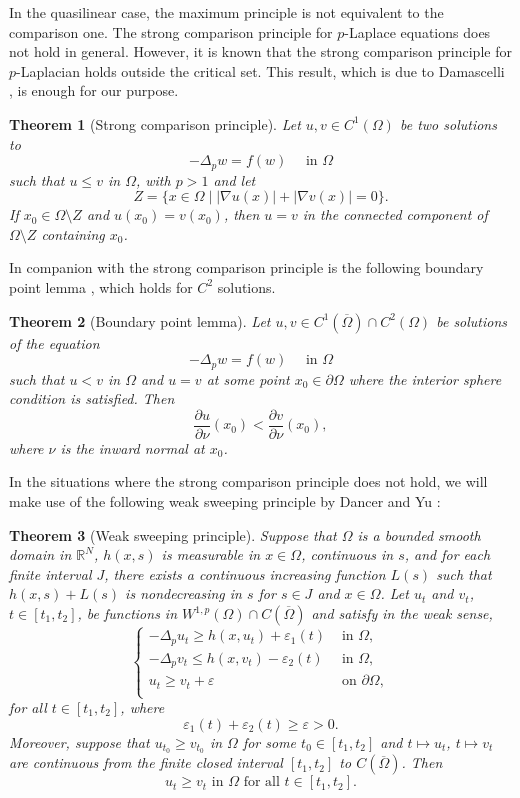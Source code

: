 \documentclass[reqno]{amsart}
\theoremstyle{plain}
\newtheorem{theorem}{Theorem}
\theoremstyle{definition}
\theoremstyle{remark}
\begin{document}
	In the quasilinear case, the maximum principle is not equivalent to the comparison one. The strong comparison principle for $p$-Laplace equations does not hold in general. However, it is known that the strong comparison principle for $p$-Laplacian holds outside the critical set. This result, which is due to Damascelli \cite{MR1632933}, is enough for our purpose.
	\begin{theorem}[Strong comparison principle]\label{th:scp}
		Let $u,v\in C^1(\Omega)$ be two solutions to
		\[
		-\Delta_p w = f(w) \quad\text{ in } \Omega
		\]
		such that $u \le v$ in $\Omega$, with $p>1$ and let
		\[
		Z=\{x\in\Omega \mid |\nabla u(x)|+|\nabla v(x)|=0\}.
		\]
		If $x_0\in\Omega\setminus Z$ and $u(x_0)=v(x_0)$, then $u=v$ in the connected component of $\Omega\setminus Z$ containing $x_0$.
	\end{theorem}
	
	In companion with the strong comparison principle is the following boundary point lemma \cite[Theorem 2.7.1]{MR2356201}, which holds for $C^2$ solutions.
	\begin{theorem}[Boundary point lemma]\label{lem:bpm}
		Let $u,v\in C^1(\overline{\Omega})\cap C^2(\Omega)$ be solutions of the equation
		\[
		-\Delta_p w = f(w) \quad\text{ in }\Omega
		\]
		such that $u<v$ in $\Omega$ and $u=v$ at some point $x_0 \in \partial \Omega$ where the interior sphere condition is satisfied. Then
		\[
		\frac{\partial u}{\partial \nu}(x_0)<\frac{\partial v}{\partial \nu}(x_0),
		\]
		where $\nu$ is the inward normal at $x_0$.
	\end{theorem}
	
	In the situations where the strong comparison principle does not hold, we will make use of the following weak sweeping principle by Dancer and Yu \cite{MR1955278}:
	\begin{theorem}[Weak sweeping principle]\label{th:wsp}
		Suppose that $\Omega$ is a bounded smooth domain in $\mathbb{R}^N$, $h(x, s)$ is measurable in $x \in \Omega$,
		continuous in $s$, and for each finite interval $J$, there exists a continuous increasing function $L(s)$ such
		that $h(x, s) + L(s)$ is nondecreasing in $s$ for $s \in J$ and $x \in \Omega$. Let $u_t$ and $v_t$, $t \in [t_1, t_2]$, be functions in $W^{1,p}(\Omega) \cap C(\overline \Omega)$ and satisfy in the weak sense,
		\[
		\begin{cases}
			-\Delta_p u_t \ge h(x,u_t) + \varepsilon_1(t) & \text{ in } \Omega,\\
			-\Delta_p v_t \le h(x,v_t) - \varepsilon_2(t) & \text{ in } \Omega,\\
			u_t \ge v_t + \varepsilon & \text{ on } \partial\Omega,\\
		\end{cases}
		\]
		for all $t \in [t_1, t_2]$, where
		\[
		\varepsilon_1(t) + \varepsilon_2(t) \ge \varepsilon > 0.
		\]
		Moreover, suppose that $u_{t_0} \ge v_{t_0}$ in $\Omega$ for some $t_0 \in [t_1, t_2]$ and $t \mapsto u_t$, $t \mapsto v_t$ are continuous from the finite closed interval $[t_1, t_2]$ to $C(\overline \Omega)$. Then
		\[
		u_t \ge v_t \text{ in } \Omega \text{ for all } t \in [t_1, t_2].
		\]
	\end{theorem}
	
\end{document}
